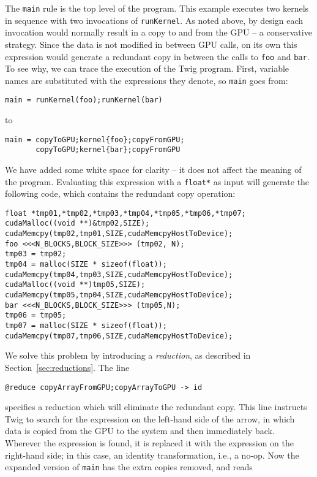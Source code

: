 The \texttt{main} rule is the top level of the program. This example executes two kernels in sequence with two invocations of \texttt{runKernel}. As noted above, by design each invocation would normally result in a copy to and from the GPU -- a conservative strategy. Since the data is not modified in between GPU calls, on its own this expression would generate a redundant copy in between the calls to \texttt{foo} and \texttt{bar}. To see why, we can trace the execution of the Twig program. First, variable names are substituted with the expressions they denote, so \texttt{main} goes from:

\begin{verbatim}
main = runKernel(foo);runKernel(bar)
\end{verbatim}

to 

\begin{verbatim}
main = copyToGPU;kernel{foo};copyFromGPU;
       copyToGPU;kernel{bar};copyFromGPU
\end{verbatim}

We have added some white space for clarity -- it does not affect the meaning of the program. Evaluating this expression with a \texttt{float*} as input will generate the following code, which contains the redundant copy operation:

\begin{verbatim}
float *tmp01,*tmp02,*tmp03,*tmp04,*tmp05,*tmp06,*tmp07;
cudaMalloc((void **)&tmp02,SIZE);
cudaMemcpy(tmp02,tmp01,SIZE,cudaMemcpyHostToDevice);
foo <<<N_BLOCKS,BLOCK_SIZE>>> (tmp02, N);
tmp03 = tmp02;
tmp04 = malloc(SIZE * sizeof(float));
cudaMemcpy(tmp04,tmp03,SIZE,cudaMemcpyHostToDevice);
cudaMalloc((void **)tmp05,SIZE);
cudaMemcpy(tmp05,tmp04,SIZE,cudaMemcpyHostToDevice);
bar <<<N_BLOCKS,BLOCK_SIZE>>> (tmp05,N);
tmp06 = tmp05;
tmp07 = malloc(SIZE * sizeof(float));
cudaMemcpy(tmp07,tmp06,SIZE,cudaMemcpyHostToDevice);
\end{verbatim}

We solve this problem by introducing a \emph{reduction}, as described in Section~\ref{sec:reductions}. The line

\begin{verbatim}
@reduce copyArrayFromGPU;copyArrayToGPU -> id
\end{verbatim}

specifies a reduction which will eliminate the redundant copy. This line instructs Twig to search for the expression on the left-hand side of the arrow, in which data is copied from the GPU to the system and then immediately back. Wherever the expression is found, it is replaced it with the expression on the right-hand side; in this case, an identity transformation, i.e., a no-op. Now the expanded version of \texttt{main} has the extra copies removed, and reads

